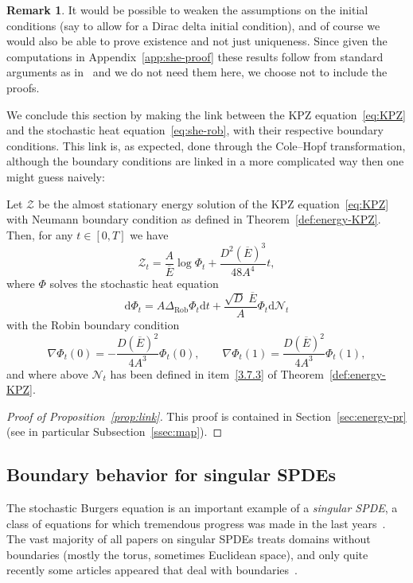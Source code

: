 \documentclass[10pt]{amsart}
\theoremstyle{definition}\newtheorem{defi}[theo]{Definition}\newtheorem{rema}[theo]{Remark}\newtheorem{exam}[theo]{Example}\newtheorem{exem}[theo]{Example}\newtheorem{nota}[theo]{Notation}
\newcommand{\mc}[1]{{\mathcal #1}}
\renewcommand{\mc}[1]{{\mathcal #1}}
\renewcommand{\bar}{\overline}
\newcommand*{\dd}{\mathrm{d}}
\newcommand*{\dt}{\dd t}
\begin{document}
\begin{rema}
It would be possible to weaken the assumptions on the initial conditions (say to allow for a Dirac delta initial condition), and of course we would also be able to prove existence and not just uniqueness. Since given the computations in Appendix~\ref{app:she-proof} these results follow from standard arguments as in~\cite{Quastel2011,Walsh1986} and we do not need them here, we choose not to include the proofs.
\end{rema}


We conclude this section by making the link between the KPZ equation~\eqref{eq:KPZ} and the stochastic heat equation~\eqref{eq:she-rob}, with their respective boundary conditions. This link is, as expected, done through the Cole--Hopf transformation, although the boundary conditions are linked in a more complicated way then one might guess naively:

\begin{prop}\label{prop:link}
Let $\mc Z$ be the almost stationary energy solution of the KPZ equation~\eqref{eq:KPZ} with Neumann boundary condition as defined in Theorem~\ref{def:energy-KPZ}. Then, for any $t\in [0,T]$ we have
\[
\mc Z_t = \frac{A}{\bar{E}} \log \Phi_t + \frac{D^2(\bar{E})^3}{48 A^4}t,
\]
where $\Phi$ solves the stochastic heat equation
\[
\dd \Phi_t = A \Delta_{\mathrm{Rob}} \Phi_t \dt + \frac{\sqrt{D}\; \bar{E}}{A} \Phi_t \dd\mc N_t
\]
with the Robin boundary condition
\[
\nabla \Phi_t(0) = - \frac{D(\bar{E})^2}{4A^3} \Phi_t(0), \qquad \nabla \Phi_t(1) = \frac{D(\bar{E})^2}{4A^3} \Phi_t(1),
\]
and where above $\mc N_t$ has been defined in item~\eqref{3.7.3} of Theorem~\ref{def:energy-KPZ}.
\end{prop}

\begin{proof}[Proof of Proposition~\ref{prop:link}]
This proof is contained in Section~\ref{sec:energy-pr} (see in particular Subsection~\ref{ssec:map}).
\end{proof}

\subsection{Boundary behavior for singular SPDEs} \label{ssec:boundary}

The stochastic Burgers equation is an important example of a \emph{singular SPDE}, a class of equations for which tremendous progress was made in the last years~\cite{Hairer2014, Gubinelli2015Paracontrolled}. The vast majority of all papers on singular SPDEs treats domains without boundaries (mostly the torus, sometimes Euclidean space), and only quite recently some articles appeared that deal with boundaries~\cite{Corwin2016, Gerencser2018}.
\end{document}
